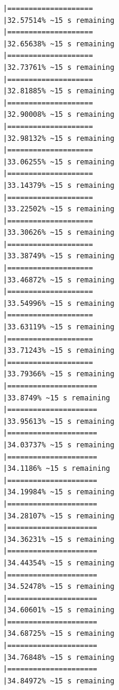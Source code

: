 \documentclass{article}\usepackage[]{graphicx}\usepackage[]{xcolor}
\makeatletter
\newenvironment{kframe}{%
 \def\at@end@of@kframe{}%
 \ifinner\ifhmode%
  \def\at@end@of@kframe{\end{minipage}}%
  \begin{minipage}{\columnwidth}%
 \fi\fi%
 \def\FrameCommand##1{\hskip\@totalleftmargin \hskip-\fboxsep
 \colorbox{shadecolor}{##1}\hskip-\fboxsep
     \hskip-\linewidth \hskip-\@totalleftmargin \hskip\columnwidth}%
 \MakeFramed {\advance\hsize-\width
   \@totalleftmargin\z@ \linewidth\hsize
   \@setminipage}}%
 {\par\unskip\endMakeFramed%
 \at@end@of@kframe}
\newenvironment{knitrout}{}{} %
\makeatother
\begin{document}
\begin{knitrout}
\begin{kframe}
\begin{verbatim}
|====================                                          |32.57514% ~15 s remaining 
|====================                                          |32.65638% ~15 s remaining 
|====================                                          |32.73761% ~15 s remaining 
|====================                                          |32.81885% ~15 s remaining 
|====================                                          |32.90008% ~15 s remaining 
|====================                                          |32.98132% ~15 s remaining 
|====================                                          |33.06255% ~15 s remaining 
|====================                                          |33.14379% ~15 s remaining 
|====================                                          |33.22502% ~15 s remaining 
|====================                                          |33.30626% ~15 s remaining 
|====================                                          |33.38749% ~15 s remaining 
|====================                                          |33.46872% ~15 s remaining 
|====================                                          |33.54996% ~15 s remaining 
|====================                                          |33.63119% ~15 s remaining 
|====================                                          |33.71243% ~15 s remaining 
|====================                                          |33.79366% ~15 s remaining 
|=====================                                         |33.8749% ~15 s remaining  
|=====================                                         |33.95613% ~15 s remaining 
|=====================                                         |34.03737% ~15 s remaining 
|=====================                                         |34.1186% ~15 s remaining  
|=====================                                         |34.19984% ~15 s remaining 
|=====================                                         |34.28107% ~15 s remaining 
|=====================                                         |34.36231% ~15 s remaining 
|=====================                                         |34.44354% ~15 s remaining 
|=====================                                         |34.52478% ~15 s remaining 
|=====================                                         |34.60601% ~15 s remaining 
|=====================                                         |34.68725% ~15 s remaining 
|=====================                                         |34.76848% ~15 s remaining 
|=====================                                         |34.84972% ~15 s remaining 

\end{verbatim}
\end{kframe}
\end{knitrout}
\end{document}
